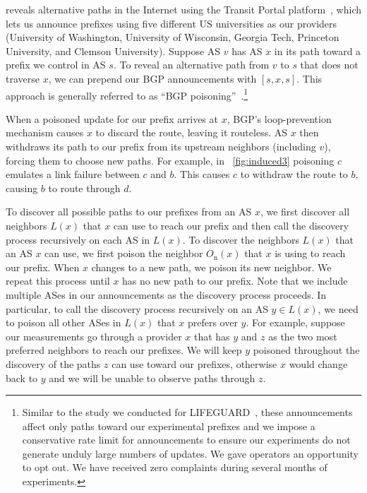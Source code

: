  \ouralgo
reveals alternative paths in the Internet using the Transit Portal
platform~\cite{bgpmux}, which lets us announce prefixes using five
different US universities as our providers (University of Washington,
University of Wisconsin, Georgia Tech, Princeton University, and Clemson
University).  Suppose AS $v$ has AS $x$ in its path toward a prefix we
control in AS $s$.  To reveal an alternative path from $v$ to
$s$ that does not traverse $x$, we can prepend our BGP announcements
with $[s, x, s]$.  This approach is generally referred to as 
``BGP poisoning''~\cite{optometry, lorenzo-thesis, lifeguard}.\footnote{Similar to 
the study we conducted for LIFEGUARD~\cite{lifeguard}, these announcements 
affect only paths toward our experimental prefixes and we impose a conservative 
rate limit for announcements to ensure our experiments do not generate unduly 
large numbers of updates. We gave operators an opportunity to opt out.
We have received zero complaints during several 
months of experiments.} 

When a poisoned update for our prefix arrives at $x$,
BGP's loop-prevention mechanism causes $x$ to discard the route, leaving it routeless.
AS $x$ then withdraws its path to our prefix
from its upstream neighbors (including $v$), forcing them to choose new
paths.  For example, in \fig~\ref{fig:induced3} poisoning $c$ emulates a
link failure between $c$ and $b$.  This causes $c$ to withdraw the route
to $b$, causing $b$ to route through $d$.  



To discover all possible paths to our prefixes from an AS $x$, we first
discover all neighbors $L(x)$ that $x$ can use to reach our prefix and
then call the discovery process recursively on each AS in $L(x)$.  To
discover the neighbors $L(x)$ that an AS $x$ can use, we first poison
the neighbor $O_\mathrm{n}(x)$ that $x$ is using to reach our prefix.
When $x$ changes to a new path, we poison its new neighbor.  
We repeat this process until $x$ has no new path to our prefix.
Note that we include multiple ASes in our announcements as the discovery process
proceeds. In particular, to call the discovery process recursively on an
AS $y \in L(x)$, we need to poison all other ASes in $L(x)$ that $x$
prefers over $y$.  For example, suppose our measurements go through a
provider $x$ that has $y$ and $z$ as the two most preferred neighbors to
reach our prefixes. We will keep $y$ poisoned throughout the discovery
of the paths $z$ can use toward our prefixes, otherwise $x$ would change
back to $y$ and we will be unable to observe paths through $z$.  

